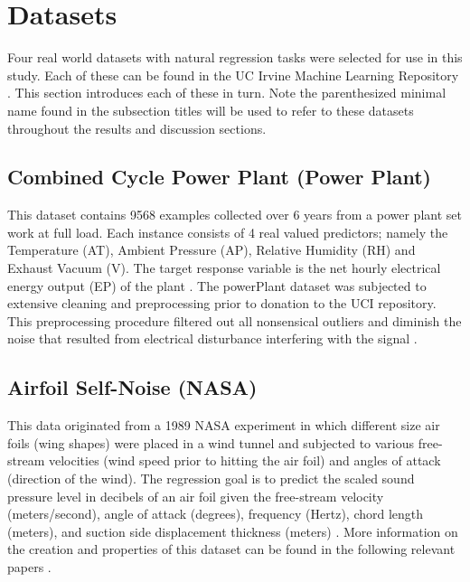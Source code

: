 \documentclass[9pt, conference]{IEEEtran}
\begin{document}
\section{Datasets}
\label{sec:datasets}
Four real world datasets with natural regression tasks were selected for use in this study. Each of these can be found in the UC Irvine Machine Learning Repository \cite{Lichman:2013}. This section introduces each of these in turn. Note the parenthesized minimal name found in the subsection titles will be used to refer to these datasets throughout the results and discussion sections.

\subsection{Combined Cycle Power Plant (Power Plant)}
This dataset contains 9568 examples collected over 6 years from a power plant set work at full load. Each instance consists of 4 real valued predictors; namely the  Temperature (AT), Ambient Pressure (AP), Relative Humidity (RH) and Exhaust Vacuum (V). The target response variable is the net hourly electrical energy output (EP) of the plant \cite{powerPlantDataset}. The powerPlant dataset was subjected to extensive cleaning and preprocessing prior to donation to the UCI repository. This preprocessing procedure filtered out all nonsensical outliers and diminish the noise that resulted from electrical disturbance interfering with the signal \cite{powerPlantCiteRequest1} \cite{powerPlantCiteRequest2}.

\subsection{Airfoil Self-Noise (NASA)}
This data originated from a 1989 NASA experiment in which different size air foils (wing shapes) were placed in a wind tunnel and subjected to various free-stream velocities (wind speed prior to hitting the air foil) and angles of attack (direction of the wind). The regression goal is to predict the scaled sound pressure level in decibels of an air foil given the free-stream velocity (meters/second), angle of attack (degrees), frequency (Hertz), chord length (meters), and suction side displacement thickness (meters) \cite{airFoilDataset}. More information on the creation and properties of this dataset can be found in the following relevant papers \cite{nasaCiteRequest1} \cite{nasaCiteRequest2} \cite{nasaCiteRequest3}.
\end{document}
